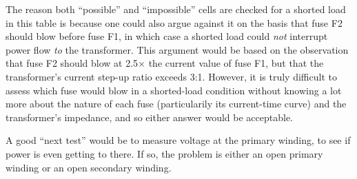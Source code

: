 The reason both ``possible'' and ``impossible'' cells are checked for a shorted load in this table is because one could also argue against it on the basis that fuse F2 should blow before fuse F1, in which case a shorted load could {\it not} interrupt power flow {\it to} the transformer.  This argument would be based on the observation that fuse F2 should blow at 2.5$\times$ the current value of fuse F1, but that the transformer's current step-up ratio exceeds 3:1.  However, it is truly difficult to assess which fuse would blow in a shorted-load condition without knowing a lot more about the nature of each fuse (particularily its current-time curve) and the transformer's impedance, and so either answer would be acceptable.

\vskip 10pt

A good ``next test'' would be to measure voltage at the primary winding, to see if power is even getting to there.  If so, the problem is either an open primary winding or an open secondary winding.





